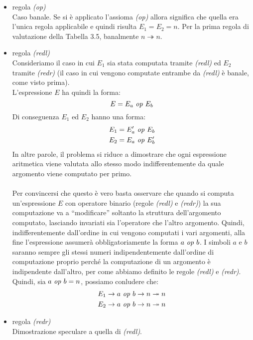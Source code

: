     \begin{itemize}
        \item regola \textit{(op)}\\
            Caso banale. Se si è applicato l'assioma \textit{(op)} allora significa che quella era l'unica regola applicabile e quindi risulta $E_1=E_2=n$. Per la prima regola di valutazione della Tabella 3.5, banalmente $n \twoheadrightarrow n$.
        \item regola \textit{(redl)}\\
            Consideriamo il caso in cui $E_1$ sia stata computata tramite \textit{(redl)} ed $E_2$ tramite \textit{(redr)} (il caso in cui vengono computate entrambe da \textit{(redl)} è banale, come visto prima).\\
            L'espressione $E$ ha quindi la forma:
            $$E=E_a \mbox{ \textit{op} } E_b$$
            Di conseguenza $E_1$ ed $E_2$ hanno una forma:
            \begin{align*}
                E_1 &= E_a' \mbox{ \textit{op} } E_b\\
                E_2 &= E_a \mbox{ \textit{op} } E_b'
            \end{align*}
            In altre parole, il problema si riduce a dimostrare che ogni espressione aritmetica viene valutata allo stesso modo indifferentemente da quale argomento viene computato per primo.\\
            \\
            Per convincersi che questo è vero basta osservare che quando si computa un'espressione $E$ con operatore binario (regole \textit{(redl)} e \textit{(redr)}) la sua computazione va a ``modificare'' soltanto la struttura dell'argomento computato, lasciando invariati sia l'operatore che l'altro argomento. Quindi, indifferentemente dall'ordine in cui vengono computati i vari argomenti, alla fine l'espressione assumerà obbligatoriamente la forma $a \mbox{ \textit{op} } b$. I simboli $a$ e $b$ saranno sempre gli stessi numeri indipendentemente dall'ordine di computazione proprio perché la computazione di un argomento è indipendente dall'altro, per come abbiamo definito le regole \textit{(redl)} e \textit{(redr)}. Quindi, sia $a \mbox{ \textit{op} } b = n$, possiamo conludere che:
            \begin{align*}
                E_1 &\rightarrow a \mbox{ \textit{op} } b \rightarrow n \twoheadrightarrow n\\
                E_2 &\rightarrow a \mbox{ \textit{op} } b \rightarrow n \twoheadrightarrow n
            \end{align*}
        \item regola \textit{(redr)}\\
            Dimostrazione speculare a quella di \textit{(redl)}.
    \end{itemize}

